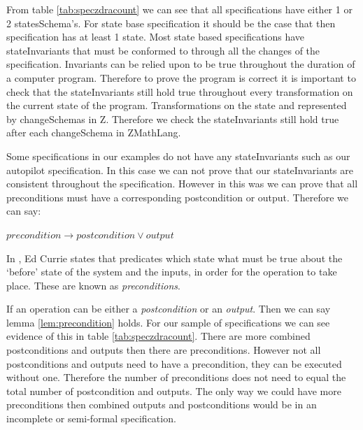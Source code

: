 From table \ref{tab:speczdracount} we can see that all specifications have
either 1 or 2 statesSchema's. For state base specification it should be the case
that then specification has at least 1 state. Most state based specifications
have stateInvariants that must be conformed to through all the changes of the
specification.
Invariants can be relied upon to be true throughout the duration of a computer program.
Therefore to prove the program is correct it is important to check that the
stateInvariants still hold true throughout every transformation on the current
state of the program. Transformations on the state and represented by changeSchemas
in Z. Therefore we check the stateInvariants still hold true after each changeSchema
in ZMathLang.

Some specifications in our examples do not have any stateInvariants 
such as our autopilot specification. In this case we can not prove that our
stateInvariants are consistent throughout the specification. However in this was we
can prove that all preconditions must have a corresponding postcondition or output. Therefore we
can say:

\begin{lemma}
$precondition \longrightarrow postcondition \lor output$
\label{lem:precondition}
\end{lemma}

In \cite{essenceofz}, Ed Currie states that predicates which state what must be true 
about the `before' state of the system and the inputs, in order for 
the operation to take place. These are known as \textit{preconditions}.

If an operation can be either a \textit{postcondition} or an \textit{output}.
Then we can say lemma \ref{lem:precondition} holds.
For our sample of specifications we can see evidence of this in table \ref{tab:speczdracount}.
There are more combined postconditions and
outputs then there are preconditions. However not all postconditions and outputs
need to have a precondition, they can be executed without one. Therefore the
number of preconditions does not need to equal the total number of postcondition
and outputs.
The only way we could have more preconditions then combined outputs and postconditions
would be in an incomplete or semi-formal specification.

